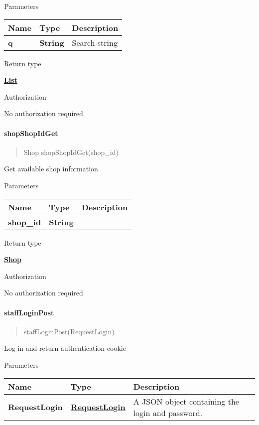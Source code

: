 Parameters

\begin{longtable}[]{@{}lll@{}}
\toprule
Name & Type & Description\tabularnewline
\midrule
\endhead
\textbf{q} & \textbf{String} & Search string\tabularnewline
\bottomrule
\end{longtable}

Return type

\href{../Models/SearchResult.md}{\textbf{List}}

Authorization

No authorization required

\hypertarget{shopshopidget}{%
\paragraph{\texorpdfstring{\textbf{shopShopIdGet}}{shopShopIdGet}}\label{shopshopidget}}

\begin{quote}
Shop shopShopIdGet(shop\_id)
\end{quote}

Get available shop information

Parameters

\begin{longtable}[]{@{}lll@{}}
\toprule
Name & Type & Description\tabularnewline
\midrule
\endhead
\textbf{shop\_id} & \textbf{String} &\tabularnewline
\bottomrule
\end{longtable}

Return type

\href{../Models/Shop.md}{\textbf{Shop}}

Authorization

No authorization required

\hypertarget{staffloginpost}{%
\paragraph{\texorpdfstring{\textbf{staffLoginPost}}{staffLoginPost}}\label{staffloginpost}}

\begin{quote}
staffLoginPost(RequestLogin)
\end{quote}

Log in and return authentication cookie

Parameters

\begin{longtable}[]{@{}lll@{}}
\toprule
Name & Type & Description\tabularnewline
\midrule
\endhead
\textbf{RequestLogin} &
\href{../Models/RequestLogin.md}{\textbf{RequestLogin}} & A JSON object
containing the login and password.\tabularnewline
\bottomrule
\end{longtable}

